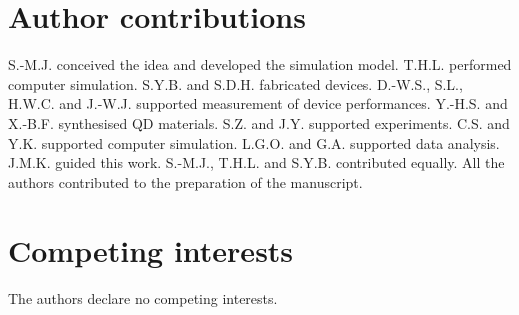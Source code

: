 \documentclass[superscriptaddress,unsortedaddress,
 amsmath,amssymb,
 aps,
]{revtex4-2}
\begin{document}
\section*{Author contributions} 
S.-M.J. conceived the idea and developed the simulation model. T.H.L. performed
computer simulation. S.Y.B. and S.D.H. fabricated devices. D.-W.S., S.L., H.W.C. and
J.-W.J. supported measurement of device performances. Y.-H.S. and X.-B.F.
synthesised QD materials. S.Z. and J.Y. supported experiments. C.S. and Y.K.
supported computer simulation. L.G.O. and G.A. supported data analysis. J.M.K.
guided this work. S.-M.J., T.H.L. and S.Y.B. contributed equally. 
All the authors contributed to the preparation of the manuscript.

\section*{Competing interests}
The authors declare no competing interests.
\end{document}
